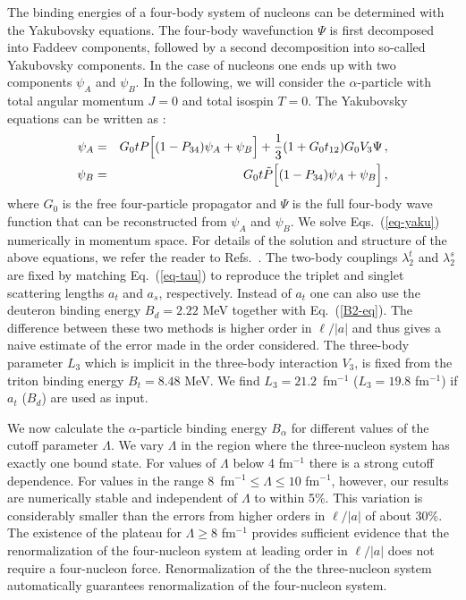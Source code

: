 \documentclass[prc,preprint,tightenlines,showpacs]{revtex4}
\newcommand{\bea}{\begin{eqnarray}}
\newcommand{\eea}{\end{eqnarray}}
\begin{document}
The binding energies of a four-body system of nucleons can 
be determined with the Yakubovsky equations. %
The four-body wavefunction $\Psi$ is first decomposed into Faddeev 
components, followed by a second decomposition into so-called
Yakubovsky components. In the case of nucleons
one ends up with two components $\psi_A$ and $\psi_B$. 
In the following, we will consider the $\alpha$-particle
with total angular momentum $J=0$ and total isospin
$T=0$. The Yakubovsky equations can be written as \cite{Glockle:1993vr}:
\bea
\psi_A&=&G_0 t P \Bigl[(1-P_{34})\psi_A + \psi_B\Bigr]
+\frac{1}{3}(1+G_0 t_{12})G_0 V_3 \Psi\,,
\nonumber\\
\psi_B&=&G_0 t \tilde{P} \Bigl[(1-P_{34})\psi_A + \psi_B\Bigr]\,,
\label{eq-yaku}
\eea
where $G_0$ is the free four-particle propagator and
$\Psi$ is the full four-body wave function that can be
reconstructed from $\psi_A$ and $\psi_B$. 
We solve Eqs.~(\ref{eq-yaku}) numerically in momentum space. 
For details of the solution and structure of the above equations, 
we refer the reader to  Refs.~\cite{Platter:2004qn,PlatterNew}.
The two-body couplings $\lambda_2^t$
and $\lambda_2^s$ are fixed by matching Eq.~(\ref{eq-tau}) to
reproduce the triplet and singlet scattering lengths 
$a_t$ and $a_s$, respectively. 
Instead of $a_t$ one can also use the deuteron binding energy 
$B_d=2.22$ MeV together with Eq.~(\ref{B2-eq}). The difference between 
these two methods is higher order in $\ell/|a|$ and thus gives a
naive estimate of the error made in the order considered.
The three-body parameter $L_3$ which is implicit in the three-body
interaction $V_3$, is fixed from the triton binding energy
$B_t=8.48$ MeV. We find $L_3=21.2$~fm$^{-1}$ ($L_3=19.8$ fm$^{-1}$) 
if $a_t$ ($B_d$) are used 
as input.

We now calculate the $\alpha$-particle binding energy $B_\alpha$
for different values of the cutoff parameter $\Lambda$. We vary
$\Lambda$ in the region where the three-nucleon system has exactly
one bound state. 
For values of $\Lambda$ below  4 fm$^{-1}$ there is a strong cutoff
dependence. For values in the range 8~fm$^{-1}\leq \Lambda
\leq 10$ fm$^{-1}$, however, our results are numerically stable and 
independent of $\Lambda$ to within 5\%. 
This variation is considerably smaller than 
the errors from higher orders in $\ell/|a|$ of about 30\%.
The existence of the plateau
for $\Lambda \geq 8$ fm$^{-1}$ provides sufficient evidence that the 
renormalization of the four-nucleon system at leading order in
$\ell/|a|$ does not require a four-nucleon force. Renormalization
of the the three-nucleon system automatically guarantees
renormalization of the four-nucleon system.
\end{document}
